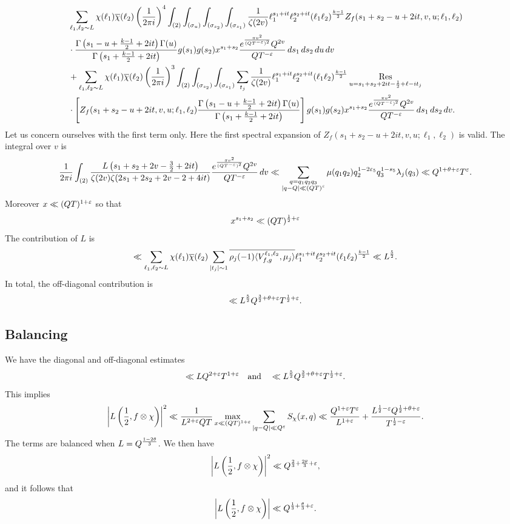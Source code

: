 \documentclass[12pt,reqno,oneside]{amsart}
\begin{document}
    \begin{align*}
      &\sum_{\ell_{1},\ell_{2} \sim L}\chi(\ell_{1})\overline{\chi}(\ell_{2})\left(\frac{1}{2\pi i}\right)^{4}\int_{(2)}\int_{(\sigma_{u})}\int_{(\sigma_{s_{2}})}\int_{(\sigma_{s_{1}})}\frac{1}{\zeta(2v)}\ell_{1}^{s_{1}+it}\ell_{2}^{s_{2}+it}(\ell_{1}\ell_{2})^{\frac{k-1}{2}}Z_{f}(s_{1}+s_{2}-u+2it,v,u;\ell_{1},\ell_{2}) \\
      &\cdot \frac{\Gamma\left(s_{1}-u+\frac{k-1}{2}+2it\right)\Gamma(u)}{\Gamma\left(s_{1}+\frac{k-1}{2}+2it\right)}g(s_{1})g(s_{2})x^{s_{1}+s_{2}}\frac{e^{\frac{\pi v^{2}}{(QT^{-\varepsilon})^{2}}}Q^{2v}}{QT^{-\varepsilon}}\,ds_{1}\,ds_{2}\,du\,dv \\
      &+ \sum_{\ell_{1},\ell_{2} \sim L}\chi(\ell_{1})\overline{\chi}(\ell_{2})\left(\frac{1}{2\pi i}\right)^{3}\int_{(2)}\int_{(\sigma_{s_{2}})}\int_{(\sigma_{s_{1}})}\sum_{t_{j}}\frac{1}{\zeta(2v)}\ell_{1}^{s_{1}+it}\ell_{2}^{s_{2}+it}(\ell_{1}\ell_{2})^{\frac{k-1}{2}}\operatorname*{\mathrm{Res}}_{u = s_{1}+s_{2}+2it-\frac{1}{2}+\ell-it_{j}} \\
      &\cdot \left[Z_{f}(s_{1}+s_{2}-u+2it,v,u;\ell_{1},\ell_{2})\frac{\Gamma\left(s_{1}-u+\frac{k-1}{2}+2it\right)\Gamma(u)}{\Gamma\left(s_{1}+\frac{k-1}{2}+2it\right)}\right]g(s_{1})g(s_{2})x^{s_{1}+s_{2}}\frac{e^{\frac{\pi v^{2}}{(QT^{-\varepsilon})^{2}}}Q^{2v}}{QT^{-\varepsilon}}\,ds_{1}\,ds_{2}\,dv.
    \end{align*}
    Let us concern ourselves with the first term only. Here the first spectral expansion of $Z_{f}(s_{1}+s_{2}-u+2it,v,u;\ell_{1},\ell_{2})$ is valid. The integral over $v$ is
    \[
      \frac{1}{2\pi i}\int_{(2)}\frac{L\left(s_{1}+s_{2}+2v-\frac{3}{2}+2it\right)}{\zeta(2v)\zeta(2s_{1}+2s_{2}+2v-2+4it)}\frac{e^{\frac{\pi v^{2}}{(QT^{-\varepsilon})^{2}}}Q^{2v}}{QT^{-\varepsilon}}\,dv \ll \sum_{\substack{q = q_{1}q_{2}q_{3} \\ |q-Q| \ll (QT)^{\varepsilon}}}\mu(q_{1}q_{2})q_{2}^{1-2\varepsilon_{5}}q_{3}^{1-s_{5}}\lambda_{j}(q_{3}) \ll Q^{1+\theta+\varepsilon}T^{\varepsilon}.
    \]
    Moreover $x \ll (QT)^{1+\varepsilon}$ so that
    \[
      x^{s_{1}+s_{2}} \ll (QT)^{\frac{1}{2}+\varepsilon}
    \]
    The contribution of $L$ is
    \[
      \ll \sum_{\ell_{1},\ell_{2} \sim L}\chi(\ell_{1})\overline{\chi}(\ell_{2})\sum_{|t_{j}| \sim 1}\overline{\rho_{j}(-1)\langle V_{f,g}^{\ell_{1},\ell_{2}},\mu_{j}\rangle}\ell_{1}^{s_{1}+it}\ell_{2}^{s_{2}+it}(\ell_{1}\ell_{2})^{\frac{k-1}{2}} \ll L^{\frac{5}{2}}.
    \]
    In total, the off-diagonal contribution is
    \[
      \ll L^{\frac{5}{2}}Q^{\frac{3}{2}+\theta+\varepsilon}T^{\frac{1}{2}+\varepsilon}.
    \]
  \subsection*{Balancing}
    We have the diagonal and off-diagonal estimates
    \[
      \ll LQ^{2+\varepsilon}T^{1+\varepsilon} \quad \text{and} \quad \ll L^{\frac{5}{2}}Q^{\frac{3}{2}+\theta+\varepsilon}T^{\frac{1}{2}+\varepsilon}.
    \]
    This implies
    \[
      \left|L\left(\frac{1}{2},f \otimes \chi \right)\right|^{2} \ll \frac{1}{L^{2+\varepsilon}QT}\max_{x \ll (QT)^{1+\varepsilon}}\sum_{|q-Q| \ll Q^{\varepsilon}}S_{\chi}(x,q) \ll \frac{Q^{1+\varepsilon}T^{\varepsilon}}{L^{1+\varepsilon}}+\frac{L^{\frac{1}{2}-\varepsilon}Q^{\frac{1}{2}+\theta+\varepsilon}}{T^{\frac{1}{2}-\varepsilon}}.
    \]
    The terms are balanced when $L = Q^{\frac{1-2\theta}{3}}$. We then have
    \[
      \left|L\left(\frac{1}{2},f \otimes \chi \right)\right|^{2} \ll Q^{\frac{2}{3}+\frac{2\theta}{3}+\varepsilon},
    \]
    and it follows that
    \[
      \left|L\left(\frac{1}{2},f \otimes \chi \right)\right| \ll Q^{\frac{1}{3}+\frac{\theta}{3}+\varepsilon}.
    \]
 
\end{document}
